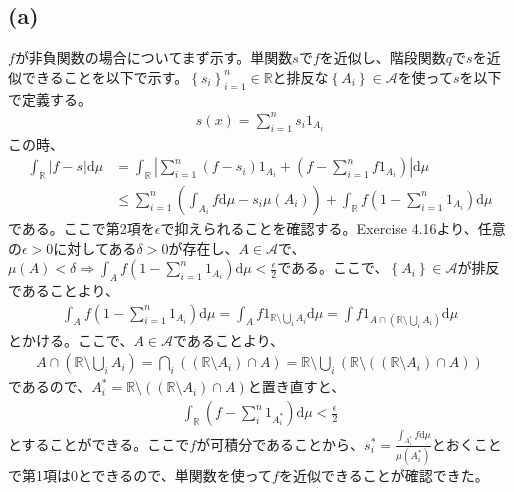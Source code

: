 \documentclass{article}
\begin{document}
\subsection{(a)}
$f$が非負関数の場合についてまず示す。単関数$s$で$f$を近似し、階段関数$q$で$s$を近似できることを以下で示す。$\left\{ s_i \right\}_{i = 1}^n \in \mathbb{R}$と排反な$\left\{ A_i \right\} \in \mathcal{A}$を使って$s$を以下で定義する。
\begin{align*}
	s(x) = \sum_{i = 1}^n s_i 1_{A_i}
\end{align*}
この時、
\begin{align*}
	\int_{\mathbb{R}} |f-s| \mathrm{d}\mu &= \int_{\mathbb{R}}\left| \sum_{i = 1}^n (f-s_i)1_{A_i} + \left(f- \sum_{i = 1}^n f1_{A_i} \right) \right| \mathrm{d}\mu\\
	&\leq \sum_{i = 1}^n \left( \int_{A_i} f\mathrm{d}\mu - s_i \mu(A_i) \right) + \int_{\mathbb{R}} f\left( 1 - \sum_{i=1}^n 1_{A_i} \right) \mathrm{d}\mu
\end{align*}
である。ここで第2項を$\epsilon$で抑えられることを確認する。Exercise 4.16より、任意の$\epsilon > 0$に対してある$\delta > 0$が存在し、$A\in \mathcal{A}$で、$\mu(A) < \delta \Rightarrow \int_A f \left( 1 - \sum_{i=1}^n 1_{A_i} \right) \mathrm{d}\mu < \frac{\epsilon}{2}$である。ここで、$\left\{ A_i \right\} \in \mathcal{A}$が排反であることより、
\begin{align*}
	\int_A f \left( 1 - \sum_{i=1}^n 1_{A_i} \right) \mathrm{d}\mu = \int_A f1_{\mathbb{R}\setminus \bigcup_i A_i} \mathrm{d}\mu = \int f1_{A \cap \left( \mathbb{R}\setminus \bigcup_i A_i \right)} \mathrm{d}\mu
\end{align*}
とかける。ここで、$A \in \mathcal{A}$であることより、
\begin{align*}
	A \cap \left( \mathbb{R}\setminus \bigcup_i A_i \right) = \bigcap_i \left( (\mathbb{R} \setminus A_i) \cap A \right) = \mathbb{R} \setminus \bigcup_i \left( \mathbb{R}\setminus \left( (\mathbb{R} \setminus A_i) \cap A \right) \right)
\end{align*}
であるので、$A_i^{*} = \mathbb{R}\setminus \left( (\mathbb{R} \setminus A_i) \cap A \right)$と置き直すと、
\begin{align*}
	\int_{\mathbb{R}} \left( f - \sum_i^n 1_{A_i^{*}} \right) \mathrm{d}\mu < \frac{\epsilon}{2}
\end{align*}
とすることができる。ここで$f$が可積分であることから、$s_i^{*} = \frac{\int_{A_i^{*}} f\mathrm{d}\mu}{\mu(A_i^{*})}$とおくことで第1項は$0$とできるので、単関数を使って$f$を近似できることが確認できた。
\end{document}
